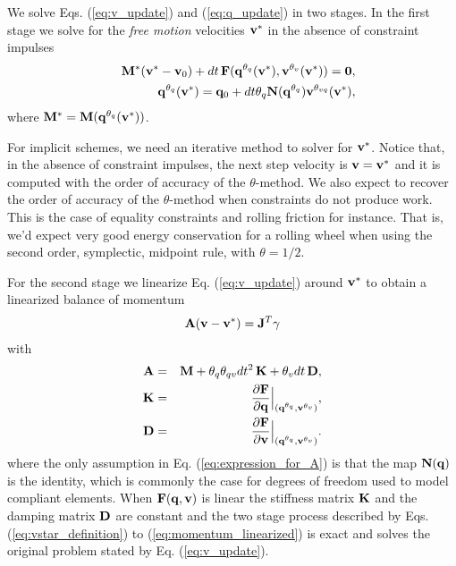 We solve Eqs. (\ref{eq:v_update}) and (\ref{eq:q_update}) in two stages. In the
first stage we solve for the \textit{free motion} velocities ${\mathbf{v}}^*$ in the
absence of constraint impulses 
\begin{eqnarray}
	&&\mf{M}^*(\mf{v}^*-\mf{v}_0) + dt\,\mf{F}(\mf{q}^{\theta_q}(\mf{v}^*), \mf{v}^{\theta_v}(\mf{v}^*)) = \mf{0},
	\label{eq:vstar_definition}\\
	&&\mf{q}^{\theta_q}(\mf{v}^*) = \mf{q}_0 + dt\theta_q\mf{N}(\mf{q}^{\theta_{q}})\mf{v}^{\theta_{vq}}(\mf{v}^*),
	\label{eq:qstar_definition}
\end{eqnarray}
where ${\mathbf{M}}^* = {\mathbf{M}}({\mathbf{q}}^{\theta_q}({\mathbf{v}}^*))$.

For implicit schemes, we need an iterative method to solver for ${\mathbf{v}}^*$.
Notice that, in the absence of constraint impulses, the next step velocity is
${\mathbf{v}}={\mathbf{v}}^*$ and it is computed with the order of accuracy of the
$\theta\text{-method}$. We also expect to recover the order of accuracy of the
$\theta\text{-method}$ when constraints do not produce work.
 This is the case of equality constraints and rolling friction for
instance. That is, we'd expect very good energy conservation for a rolling wheel
when using the second order, symplectic, midpoint rule, with $\theta=1/2$.

For the second stage we linearize Eq. (\ref{eq:v_update})
around ${\mathbf{v}}^*$ to obtain a linearized balance of momentum
\begin{eqnarray}
	\mf{A}(\mf{v}-\mf{v}^*)= \mf{J}^T\mf{\gamma}
	\label{eq:momentum_linearized}
\end{eqnarray}
with
\begin{eqnarray}
	\mf{A}&=&\mf{M}+\theta_q\theta_{qv} dt^2\,\mf{K}+\theta_v dt\,\mf{D},
	\label{eq:expression_for_A}\\
	\mf{K}&=&\frac{\partial \mf{F}}{\partial \mf{q}}\Bigr|_{(\mf{q}^{\theta_q}, \mf{v}^{\theta_v})},\\
	\mf{D}&=&\frac{\partial \mf{F}}{\partial \mf{v}}\Bigr|_{(\mf{q}^{\theta_q},
	\mf{v}^{\theta_v})}.
	\label{eq:dissipation_matrix}
\end{eqnarray}
where the only assumption in Eq. (\ref{eq:expression_for_A}) is that the map
${\mathbf{N}}({\mathbf{q}})$ is the identity, which is commonly the case for degrees of
freedom used to model compliant elements.
When ${\mathbf{F}}({\mathbf{q}}, {\mathbf{v}})$ is
linear the stiffness matrix ${\mathbf{K}}$ and the damping matrix ${\mathbf{D}}$ are
constant and the two stage process described by Eqs. (\ref{eq:vstar_definition})
to (\ref{eq:momentum_linearized}) is exact and solves the original problem
stated by Eq. (\ref{eq:v_update}).



